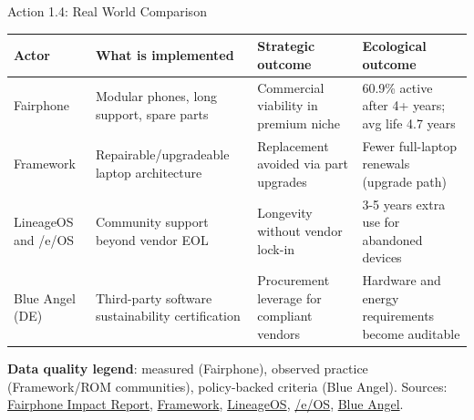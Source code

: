 \documentclass[aspectratio=169]{beamer}
\begin{document}

\begin{frame}{Action 1.4: Real World Comparison}
\scriptsize
\begin{tabular}{p{2.1cm}p{2.8cm}p{2.4cm}p{3.3cm}}
\toprule
Actor & What is implemented & Strategic outcome & Ecological outcome \\
\midrule
Fairphone & Modular phones, long support, spare parts & Commercial viability in premium niche & 60.9\% active after 4+ years; avg life 4.7 years \\
Framework & Repairable/upgradeable laptop architecture & Replacement avoided via part upgrades & Fewer full-laptop renewals (upgrade path) \\
LineageOS and /e/OS & Community support beyond vendor EOL & Longevity without vendor lock-in & 3-5 years extra use for abandoned devices \\
Blue Angel (DE) & Third-party software sustainability certification & Procurement leverage for compliant vendors & Hardware and energy requirements become auditable \\
\bottomrule
\end{tabular}

\vspace{0.15cm}
\textbf{Data quality legend}: measured (Fairphone), observed practice (Framework/ROM communities), policy-backed criteria (Blue Angel).
\vspace{0.08cm}
\tiny Sources: \href{https://www.fairphone.com/en/impact-report/}{Fairphone Impact Report}, \href{https://frame.work}{Framework}, \href{https://lineageos.org}{LineageOS}, \href{https://e.foundation}{/e/OS}, \href{https://www.blauer-engel.de/en}{Blue Angel}.
\end{frame}

\end{document}
